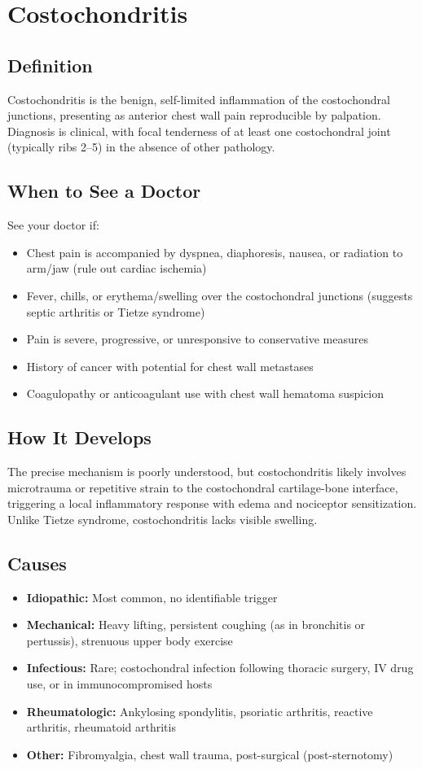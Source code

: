 \chapter{Costochondritis}

\section*{Definition}
Costochondritis is the benign, self-limited inflammation of the costochondral junctions, presenting as anterior chest wall pain reproducible by palpation. Diagnosis is clinical, with focal tenderness of at least one costochondral joint (typically ribs 2--5) in the absence of other pathology.

\section*{When to See a Doctor}
See your doctor if:
\begin{itemize}
  \item Chest pain is accompanied by dyspnea, diaphoresis, nausea, or radiation to arm/jaw (rule out cardiac ischemia)
  \item Fever, chills, or erythema/swelling over the costochondral junctions (suggests septic arthritis or Tietze syndrome)
  \item Pain is severe, progressive, or unresponsive to conservative measures
  \item History of cancer with potential for chest wall metastases
  \item Coagulopathy or anticoagulant use with chest wall hematoma suspicion
\end{itemize}

\section*{How It Develops}
The precise mechanism is poorly understood, but costochondritis likely involves microtrauma or repetitive strain to the costochondral cartilage-bone interface, triggering a local inflammatory response with edema and nociceptor sensitization. Unlike Tietze syndrome, costochondritis lacks visible swelling.

\section*{Causes}
\begin{itemize}
  \item \textbf{Idiopathic:} Most common, no identifiable trigger
  \item \textbf{Mechanical:} Heavy lifting, persistent coughing (as in bronchitis or pertussis), strenuous upper body exercise
  \item \textbf{Infectious:} Rare; costochondral infection following thoracic surgery, IV drug use, or in immunocompromised hosts
  \item \textbf{Rheumatologic:} Ankylosing spondylitis, psoriatic arthritis, reactive arthritis, rheumatoid arthritis
  \item \textbf{Other:} Fibromyalgia, chest wall trauma, post-surgical (post-sternotomy)
\end{itemize}

